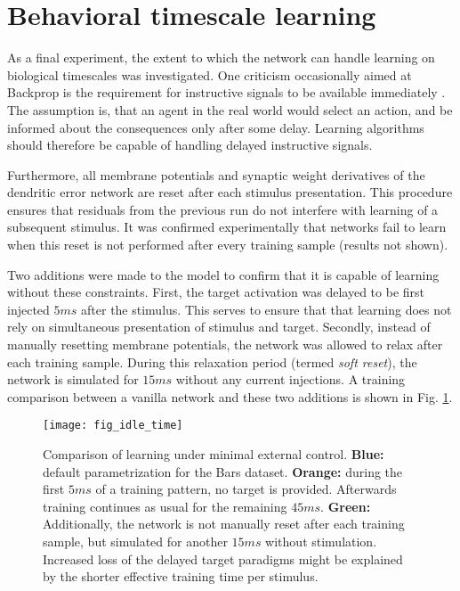 \section{Behavioral timescale learning}

As a final experiment, the extent to which the network can handle learning on biological timescales was investigated.
One criticism occasionally aimed at Backprop is the requirement for instructive signals to be available immediately
\citep{Bartunov2018}. The assumption is, that an agent in the real world would select an action, and be informed about
the consequences only after some delay. Learning algorithms should therefore be capable of handling delayed instructive
signals.

Furthermore, all membrane potentials and synaptic weight derivatives of the dendritic error network are reset after each
stimulus presentation. This procedure ensures that residuals from the previous run do not interfere with learning of a
subsequent stimulus. It was confirmed experimentally that networks fail to learn when this reset is not performed after
every training sample (results not shown).

Two additions were made to the model to confirm that it is capable of learning without these constraints. First, the
target activation was delayed to be first injected $5ms$ after the stimulus. This serves to ensure that  that learning
does not rely on simultaneous presentation of stimulus and target. Secondly, instead of manually resetting membrane
potentials, the network was allowed to relax after each training sample. During this relaxation period  (termed
\textit{soft reset}), the network is simulated for $15ms$ without any current injections. A training comparison between
a vanilla network and these two additions is shown in Fig. \ref{fig-idle-time}.


\begin{figure}[h]
    \centering
    \texttt{[image: fig\_idle\_time]}
    \caption[Comparison of learning under minimal external control]{Comparison of learning under minimal external
        control. \textbf{Blue:} default parametrization for the Bars dataset. \textbf{Orange:} during the first $5ms$ of
        a training pattern, no target is provided. Afterwards training continues as usual for the remaining $45ms$.
        \textbf{Green:} Additionally, the network is not manually reset after each training sample, but simulated for
        another $15ms$ without stimulation. Increased loss of the delayed target paradigms might be explained by the
        shorter effective training time per stimulus.}
    \label{fig-idle-time}
\end{figure}

